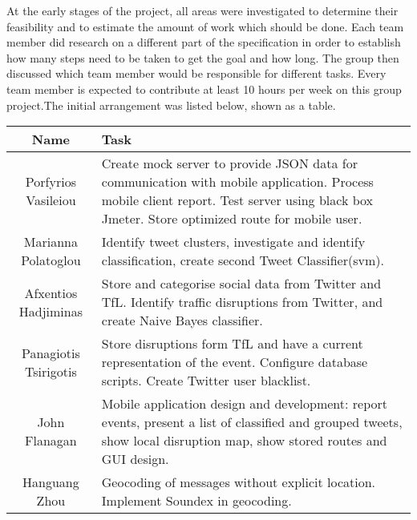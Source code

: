 At the early stages of the project, all areas were investigated to determine their feasibility and to estimate the amount of work which should be done. Each team member did research on a different part of the specification in order to establish how many steps need to be taken to get the goal and how long. The group then discussed which team member would be responsible for different tasks. Every team member is expected to contribute at least 10 hours per week on this group project.The initial arrangement was listed below, shown as a table.\\
\begin{tabular}{|c|p{11.5cm}|}
\hline
Name&Task\\
\hline
Porfyrios Vasileiou&Create mock server to provide JSON data for communication with mobile application. Process mobile client report. Test server using black box Jmeter. Store optimized route for mobile user.\\
\hline
Marianna Polatoglou&Identify tweet clusters, investigate and identify classification, create second Tweet Classifier(svm).\\
\hline
Afxentios Hadjiminas&Store and categorise social data from Twitter and TfL. Identify traffic disruptions from Twitter, and create Naive Bayes classifier.\\
\hline
Panagiotis Tsirigotis&Store disruptions form TfL and have a current representation of the event. Configure database scripts. Create Twitter user blacklist.\\
\hline
John Flanagan&Mobile application design and development: report events, present a list of classified and grouped tweets, show local disruption map, show stored routes and GUI design.\\
\hline
Hanguang Zhou&Geocoding of messages without explicit location. Implement Soundex in geocoding.\\
\hline
\end{tabular}
\\